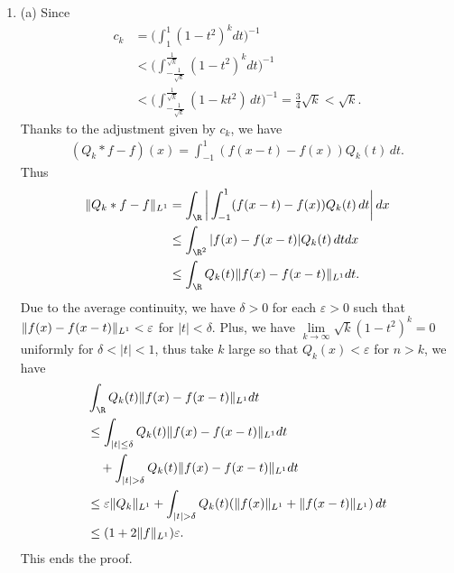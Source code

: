 \begin{enumerate}
\item[1.2.11.]
   (a) Since
   \begin{equation*}\begin{aligned}
   c_{k} &= \bigg(\int_{1}^{1} (1-t^{2})^{k}dt\bigg)^{-1} \\
   &< \bigg(\int_{-\frac{1}{\sqrt{k}}}^{\frac{1}{\sqrt{k}}} (1-t^{2})^{k}dt\bigg)^{-1} \\
   &< \bigg(\int_{-\frac{1}{\sqrt{k}}}^{\frac{1}{\sqrt{k}}} (1-kt^{2})\,dt\bigg)^{-1} 
   = \frac{3}{4}\sqrt{k} < \sqrt{k}.
   \end{aligned}\end{equation*}
   Thanks to the adjustment given by $c_{k}$, we have
   \begin{equation*}\begin{aligned}
   (Q_{k}*f-f)(x) = \int_{-1}^{1}(f(x-t)-f(x))Q_{k}(t)\,dt.
   \end{aligned}\end{equation*}
   Thus
   \begin{equation*}\begin{aligned}
   \norm{Q_{k}*f-f}_{L^1} &= \int_{\R}\bigg|\int_{-1}^{1}(f(x-t)-f(x))Q_{k}(t)\,dt\bigg|\,dx \\
   &\leq \int_{\R^{2}}|f(x)-f(x-t)|Q_{k}(t)\,dtdx \\
   &\leq \int_{\R}Q_{k}(t)\norm{f(x)-f(x-t)}_{L^1}dt.
   \end{aligned}\end{equation*}
   Due to the average continuity, we have $\delta > 0$ for each $\varepsilon>0$ 
   such that $\Vert f(x)-f(x-t) \Vert_{L^1}<\varepsilon$ for $|t|<\delta$. 
   Plus, we have $\lim\limits_{k \to \infty}\sqrt{k}(1-t^{2})^{k}=0$ uniformly for $\delta<|t|<1$, 
   thus take $k$ large so that $Q_{k}(x)<\varepsilon$ for $n>k$, we have
   \begin{equation*}\begin{aligned}
   &\int_{\R}Q_{k}(t)\norm{f(x)-f(x-t)}_{L^1}dt \\
   &\leq \int_{|t| \leq \delta}Q_{k}(t)\norm{f(x)-f(x-t)}_{L^1}dt\\
   &\quad+ \int_{|t| > \delta}Q_{k}(t)\norm{f(x)-f(x-t)}_{L^1}dt\\
   &\leq \varepsilon \norm{Q_{k}}_{L^1} + \int_{|t| > \delta}
   Q_{k}(t)(\norm{f(x)}_{L^1}+\norm{f(x-t)}_{L^1})\,dt
   \\&\leq (1 + 2\norm{f}_{L^1})\varepsilon.
   \end{aligned}\end{equation*}
   This ends the proof.


\end{enumerate}
